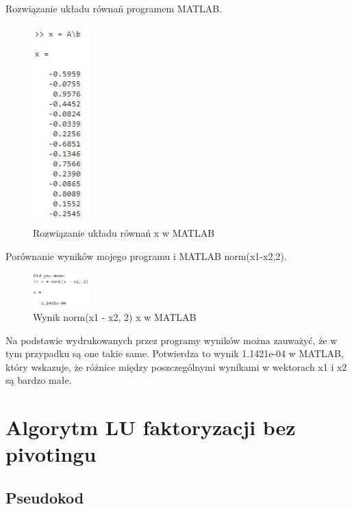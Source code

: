 \documentclass[9pt]{article}
\begin{document}
Rozwiązanie układu równań programem MATLAB.

\begin{figure}[h]
  \centering
  \includegraphics[width=0.2\textwidth]{result_x_matlab_2.jpg}
  \caption{Rozwiązanie układu równań x w MATLAB}
\end{figure}
\newpage

Porównanie wyników mojego programu i MATLAB norm(x1-x2,2).

\begin{figure}[h]
  \centering
  \includegraphics[width=0.2\textwidth]{results_x_comparison_2.jpg}
  \caption{Wynik norm(x1 - x2, 2) x w MATLAB}
\end{figure}

Na podstawie wydrukowanych przez programy wyników można zauważyć, że w tym przypadku są one takie same. Potwierdza to wynik 1.1421e-04 w MATLAB, który wskazuje, że różnice między poszczególnymi wynikami w wektorach x1 i x2 są bardzo małe.

\section{Algorytm LU faktoryzacji bez pivotingu}

\subsection{Pseudokod}
\end{document}
